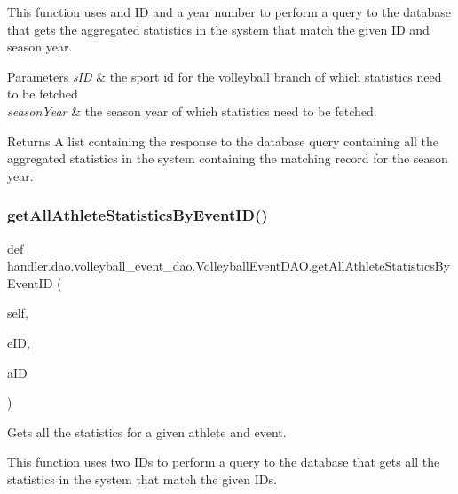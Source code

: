 This function uses and ID and a year number to perform a query to the database that gets the aggregated statistics in the system that match the given ID and season year.


\begin{DoxyParams}{Parameters}
{\em s\+ID} & the sport id for the volleyball branch of which statistics need to be fetched \\
\hline
{\em season\+Year} & the season year of which statistics need to be fetched.\\
\hline
\end{DoxyParams}
\begin{DoxyReturn}{Returns}
A list containing the response to the database query containing all the aggregated statistics in the system containing the matching record for the season year. 
\end{DoxyReturn}
\mbox{\label{classhandler_1_1dao_1_1volleyball__event__dao_1_1_volleyball_event_d_a_o_a3027982b71e04d8fa14f40f5fa896fc9}} 
\subsubsection{\texorpdfstring{get\+All\+Athlete\+Statistics\+By\+Event\+I\+D()}{getAllAthleteStatisticsByEventID()}}
{\footnotesize\ttfamily def handler.\+dao.\+volleyball\+\_\+event\+\_\+dao.\+Volleyball\+Event\+D\+A\+O.\+get\+All\+Athlete\+Statistics\+By\+Event\+ID (\begin{DoxyParamCaption}\item[{}]{self,  }\item[{}]{e\+ID,  }\item[{}]{a\+ID }\end{DoxyParamCaption})}



Gets all the statistics for a given athlete and event. 

This function uses two I\+Ds to perform a query to the database that gets all the statistics in the system that match the given I\+Ds.



